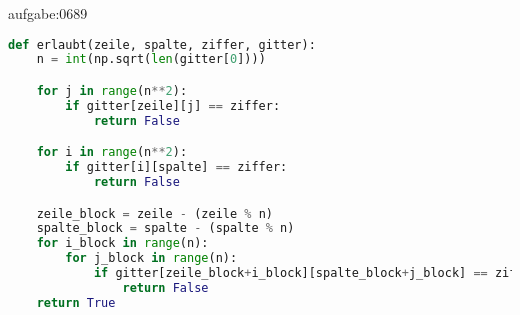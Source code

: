 \begin{antwort}{aufgabe:0689}
\lstset{basicstyle=\ttfamily\footnotesize}
\begin{lstlisting}[language=Python,caption=Funktion \pythoninline{erlaubt} für allgemeine Sudokus]
def erlaubt(zeile, spalte, ziffer, gitter):
	n = int(np.sqrt(len(gitter[0])))

	for j in range(n**2):
		if gitter[zeile][j] == ziffer:
			return False

	for i in range(n**2):
		if gitter[i][spalte] == ziffer:
			return False

	zeile_block = zeile - (zeile % n)
	spalte_block = spalte - (spalte % n)
	for i_block in range(n):
		for j_block in range(n):
			if gitter[zeile_block+i_block][spalte_block+j_block] == ziffer:
				return False
	return True
\end{lstlisting} 
\lstset{style=mystyle}
\end{antwort}


